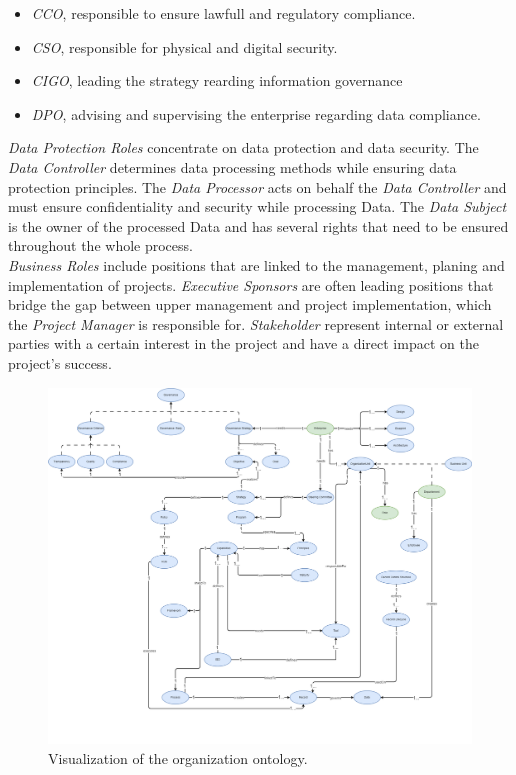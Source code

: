 \documentclass[
  a4paper,  %
  twoside,  %
  bibliography=totoc,
  headsepline,
  cleardoublepage=empty,
  parskip=half,
  draft=false
]{scrbook}
\begin{document}
\begin{itemize}
    \item \textit{\acrfull{CCO}}, responsible to ensure lawfull and regulatory compliance.
    \item \textit{\acrfull{CSO}},  responsible for physical and digital security. 
    \item \textit{\acrfull{CIGO}}, leading the strategy rearding information governance  
    \item \textit{\acrfull{DPO}}, advising and supervising the enterprise regarding data compliance. 
\end{itemize}

\textit{Data Protection Roles} concentrate on data protection and data security. The \textit{Data Controller} determines data processing methods while ensuring data protection principles. The \textit{Data Processor} acts on behalf the \textit{Data Controller} and must ensure confidentiality and security while processing Data. The \textit{Data Subject} is the owner of the processed Data and has several rights that need to be ensured throughout the whole process. \\
\textit{Business Roles} include positions that are linked to the management, planing and implementation of projects. \textit{Executive Sponsors} are often leading positions that bridge the gap between upper management and project implementation, which the \textit{Project Manager} is responsible for. \textit{Stakeholder} represent internal or external parties with a certain interest in the project and have a direct impact on the project's success.    

\begin{figure}[h]
  \centering
  \includegraphics[width=\textwidth]{graphics/organization_overall.drawio.png}
  \caption{Visualization of the organization ontology.}
  \label{fig:organization}
\end{figure}
\end{document}
